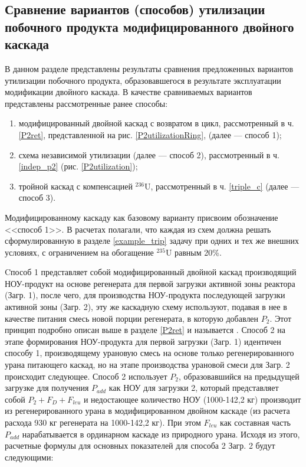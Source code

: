 \subsection{Сравнение вариантов (способов) утилизации побочного продукта модифицированного двойного каскада}

В данном разделе представлены результаты сравнения предложенных вариантов утилизации побочного продукта, образовавшегося в результате эксплуатации модификации двойного каскада. В качестве сравниваемых вариантов представлены рассмотренные ранее способы: 

\begin{enumerate}
    \item модифицированный двойной каскад с возвратом в цикл, рассмотренный в ч. \ref{P2ret}, представленной на рис. \ref{P2utilizationRing}, (далее --- способ 1);
    \item схема независимой утилизации (далее --- способ 2), рассмотренный в ч. \ref{indep_p2} (рис. \ref{P2utilization});
    \item тройной каскад с компенсацией $^{236}$U, рассмотренный в ч. \ref{triple_c} (далее --- способ 3).
\end{enumerate}

Модифицированному каскаду как базовому варианту присвоим обозначение <<способ 1>>. В расчетах полагали, что каждая из схем должна решать сформулированную в разделе \ref{example_trip} задачу при одних и тех же внешних условиях, с ограничением на обогащение $^{235}$U равным 20\%.

Cпособ 1 представляет собой модифицированный двойной каскад производящий НОУ-продукт на основе регенерата для первой загрузки активной зоны реактора (Загр. 1), после чего, для производства НОУ-продукта последующей загрузки активной зоны (Загр. 2), эту же каскадную схему используют, подавая в нее в качестве питания смесь новой порции регенерата, в которую добавлен $P_2$. Этот принцип подробно описан выше в разделе \ref{P2ret} и называется . Способ 2 на этапе формирования НОУ-продукта для первой загрузки (Загр. 1) идентичен способу 1, производящему урановую смесь на основе только регенерированного урана питающего каскад, но на этапе производства урановой смеси для Загр. 2 происходит следующее. Способ 2 использует $P_2$, образовавшийся на предыдущей загрузке для получения $P_{add}$ как НОУ для загрузки 2, который представляет собой $P_2+F_D+F_{leu}$ и недостающее количество НОУ (1000-142,2 кг) производит из регенерированного урана в модифицированном двойном каскаде (из расчета расхода 930 кг регенерата на 1000-142,2 кг). При этом $F_{leu}$ как составная часть $P_{add}$ нарабатывается в ординарном каскаде из природного урана. Исходя из этого, расчетные формулы для основных показателей для способа 2 Загр. 2 будут следующими:


